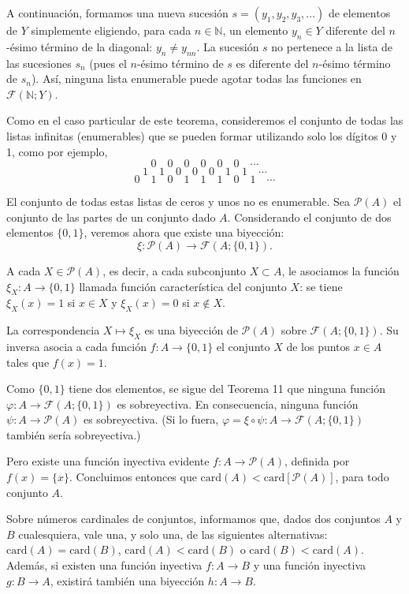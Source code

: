 \documentclass[12pt,oneside]{book}
\begin{document}
A continuación, formamos una nueva sucesión \( s = (y_1, y_2, y_3, \ldots) \) de elementos de \( Y \) simplemente eligiendo, para cada \( n \in \mathbb{N} \), un elemento \( y_n \in Y \) diferente del \( n \)-ésimo término de la diagonal: \( y_n \neq y_{nn} \). La sucesión \( s \) no pertenece a la lista de las sucesiones \( s_n \) (pues el \( n \)-ésimo término de \( s \) es diferente del \( n \)-ésimo término de \( s_n \)). Así, ninguna lista enumerable puede agotar todas las funciones en \( \mathcal{F}(\mathbb{N}; Y) \).

Como en el caso particular de este teorema, consideremos el conjunto de todas las listas infinitas (enumerables) que se pueden formar utilizando solo los dígitos 0 y 1, como por ejemplo,
\[
0 \quad 0 \quad 0 \quad 0 \quad 0 \quad 0 \quad \cdots
\]
\[
1 \quad 1 \quad 0 \quad 0 \quad 0 \quad 1 \quad 1 \quad \cdots
\]
\[
0 \quad 1 \quad 0 \quad 1 \quad 1 \quad 1 \quad 0 \quad 1 \quad \cdots
\]

El conjunto de todas estas listas de ceros y unos no es enumerable. Sea \( \mathcal{P}(A) \) el conjunto de las partes de un conjunto dado \( A \). Considerando el conjunto de dos elementos \( \{0, 1\} \), veremos ahora que existe una biyección:
\[
\xi : \mathcal{P}(A) \to \mathcal{F}(A; \{0, 1\}).
\]

A cada \( X \in \mathcal{P}(A) \), es decir, a cada subconjunto \( X \subset A \), le asociamos la función \( \xi_X : A \to \{0, 1\} \) llamada función característica del conjunto \( X \): se tiene \( \xi_X(x) = 1 \) si \( x \in X \) y \( \xi_X(x) = 0 \) si \( x \notin X \).

La correspondencia \( X \mapsto \xi_X \) es una biyección de \( \mathcal{P}(A) \) sobre \( \mathcal{F}(A; \{0, 1\}) \). Su inversa asocia a cada función \( f : A \to \{0, 1\} \) el conjunto \( X \) de los puntos \( x \in A \) tales que \( f(x) = 1 \).

Como \( \{0, 1\} \) tiene dos elementos, se sigue del Teorema 11 que ninguna función \( \varphi : A \to \mathcal{F}(A; \{0, 1\}) \) es sobreyectiva. En consecuencia, ninguna función \( \psi : A \to \mathcal{P}(A) \) es sobreyectiva. (Si lo fuera, \( \varphi = \xi \circ \psi : A \to \mathcal{F}(A; \{0, 1\}) \) también sería sobreyectiva.)

Pero existe una función inyectiva evidente \( f : A \to \mathcal{P}(A) \), definida por \( f(x) = \{x\} \). Concluimos entonces que \( \text{card}(A) < \text{card}[\mathcal{P}(A)] \), para todo conjunto \( A \).

Sobre números cardinales de conjuntos, informamos que, dados dos conjuntos \( A \) y \( B \) cualesquiera, vale una, y solo una, de las siguientes alternativas: \( \text{card}(A) = \text{card}(B) \), \( \text{card}(A) < \text{card}(B) \) o \( \text{card}(B) < \text{card}(A) \). Además, si existen una función inyectiva \( f : A \to B \) y una función inyectiva \( g : B \to A \), existirá también una biyección \( h : A \to B \).
\end{document}
